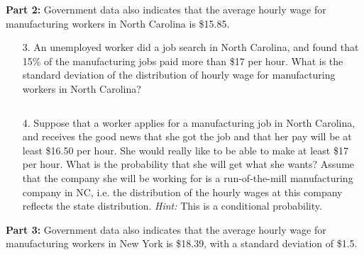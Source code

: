 \documentclass[12pt]{article}
\newcommand{\soln}[2]{$\:$\\ \vspace{#1}}{}
\begin{document}
\pagebreak

\textbf{Part 2:}
Government data also indicates that the average hourly wage for manufacturing workers in North Carolina is \$15.85. 

\begin{enumerate}

\item[3.] An unemployed worker did a job search in North Carolina, and found that 15\% of the manufacturing jobs paid 
more than \$17 per hour. What is the standard deviation of the distribution of hourly wage for manufacturing workers in 
North Carolina?

\soln{4cm}{
Given: $\mu = 15.85$, $P(X_{NC} > 17) = 0.15$ \\
This corresponds to a Z score of 1.04 since $P(Z > 1.04) = 0.15$ 
\[ 1.04 = \frac{17 - 15.85}{\sigma} \rightarrow \sigma = \frac{17 - 15.85}{1.04} = 1.11 \]
}

\item[4.] Suppose that a worker applies for a manufacturing job in North Carolina, and receives the good news that she 
got the job and that her pay will be at least \$16.50 per hour. She would really like to be able to make at least \$17 per 
hour. What is the probability that she will get what she wants? Assume that the company she will be working for is a 
run-of-the-mill manufacturing company in NC, i.e. the distribution of the hourly wages at this company reflects the state 
distribution. \textit{Hint:} This is a conditional probability. \\

\soln{6cm}{
Given: $X_{NC} \sim N(\mu = 15.85, \sigma = 1.11)$
\begin{align*}
P(X_{NC} > 17 ~|~ X_{NC} > 16.50) &= \frac{P(X_{NC} > 17 ~and~ X_{NC} > 16.50)}{P(X_{NC} > 16.50)} = \frac{P(X_{NC} > 17)}{P(X_{NC} > 16.50)} \\
&= \frac{0.15}{P\left( Z > \frac{16.50 - 15.85}{1.11} \right)} = \frac{0.15}{P(Z > 0.59)} = \frac{0.15}{0.28} = 0.53
\end{align*}
}

\end{enumerate}

\pagebreak

\textbf{Part 3:}
Government data also indicates that the average hourly wage for manufacturing workers in New York is \$18.39, with a 
standard deviation of \$1.5. 
\end{document}
